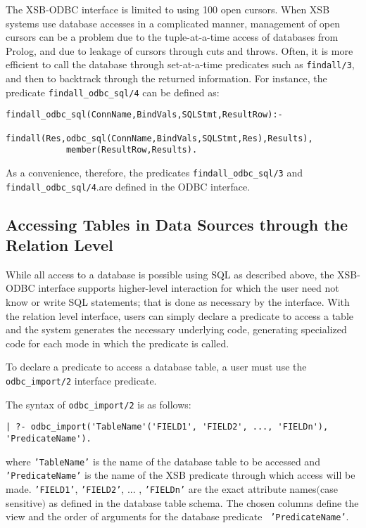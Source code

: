 The XSB-ODBC interface is limited to using 100 open cursors.  When XSB
systems use database accesses in a complicated manner, management of
open cursors can be a problem due to the tuple-at-a-time access of
databases from Prolog, and due to leakage of cursors through cuts and
throws.  Often, it is more efficient to call the database through
set-at-a-time predicates such as {\tt findall/3}, and then to
backtrack through the returned information.  For instance, 
the predicate {\tt findall\_odbc\_sql/4} can be defined as:
%
\begin{verbatim}
findall_odbc_sql(ConnName,BindVals,SQLStmt,ResultRow):- 
            findall(Res,odbc_sql(ConnName,BindVals,SQLStmt,Res),Results),
            member(ResultRow,Results).
\end{verbatim}
%
As a convenience, therefore, the predicates {\tt findall\_odbc\_sql/3}
and {\tt findall\_odbc\_sql/4}.are defined in the ODBC interface.

\subsection{Accessing Tables in Data Sources through the Relation Level}

While all access to a database is possible using SQL as described
above, the XSB-ODBC interface supports higher-level interaction for
which the user need not know or write SQL statements; that is done as
necessary by the interface.  With the relation level interface, users
can simply declare a predicate to access a table and the system
generates the necessary underlying code, generating specialized code
for each mode in which the predicate is called.

To declare a predicate to access a database table, a user must use the
{\tt odbc\_import/2} interface predicate.

The syntax of  {\tt odbc\_import/2} is as follows:

\begin{verbatim}
| ?- odbc_import('TableName'('FIELD1', 'FIELD2', ..., 'FIELDn'), 'PredicateName').
\end{verbatim}
\noindent
where {\tt 'TableName'} is the name of the database table to be
accessed and {\tt 'PredicateName'} is the name of the XSB predicate
through which access will be made. {\tt 'FIELD1'}, {\tt 'FIELD2'},
... , {\tt 'FIELDn'} are the exact attribute names$($case sensitive$)$
as defined in the database table schema.  The chosen columns define
the view and the order of arguments for the database predicate {\tt
'PredicateName'}.
 
